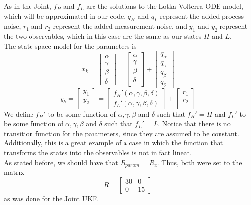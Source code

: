 As in the Joint, $f_H$ and $f_L$ are the solutions to the Lotka-Volterra ODE model, which will be approximated in our code, $q_H$ and $q_L$ represent the added process noise, $r_1$ and $r_2$ represent the added measurement noise, and $y_1$ and $y_2$ represent the two observables, which in this case are the same as our states $H$ and $L$.\\
The state space model for the parameters is
$$x_k = \begin{bmatrix}
\alpha\\
\gamma\\
\beta\\
\delta
\end{bmatrix} = \begin{bmatrix}
\alpha\\
\gamma\\
\beta\\
\delta\\
\end{bmatrix} + \begin{bmatrix}
q_{\alpha}\\
q_{\gamma}\\
q_{\beta}\\
q_{\delta}
\end{bmatrix}$$
$$y_k = \begin{bmatrix}
y_1\\
y_2\\
\end{bmatrix} = 
\begin{bmatrix}
f_{H}'(\alpha, \gamma, \beta,\delta)\\
f_{L}'(\alpha, \gamma, \beta,\delta)
\end{bmatrix}+
\begin{bmatrix}
r_1\\
r_2\\
\end{bmatrix}$$
We define $f_H'$ to be some function of $\alpha, \gamma, \beta$ and $\delta$ such that $f_H' = H$ and $f_L'$ to be  some function of $\alpha, \gamma, \beta$ and $\delta$ such that $f_L' = L$. Notice that there is no transition function for the parameters, since they are assumed to be constant. Additionally, this is a great example of a case in which the function that transforms the states into the observables is not in fact linear.\\

As stated before, we should have that $R_{param} = R_x$. Thus, both were set to the matrix $$R = \begin{bmatrix}
30 & 0\\0 & 15\end{bmatrix}$$ as was done for the Joint UKF.\\

